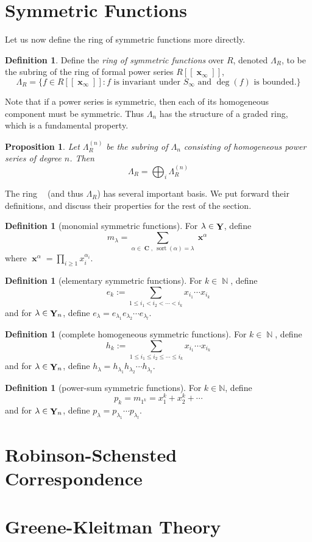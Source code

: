 \documentclass{amsart}
\theoremstyle{plain}
\newtheorem{prop}[theorem]{Proposition}
\theoremstyle{definition}
\newtheorem{definition}[theorem]{Definition}
\DeclareMathOperator{\nn}{\mathbb{N}}
\DeclareMathOperator{\yy}{{\bf Y}}
\DeclareMathOperator{\xx}{\textbf{x}}
\DeclareMathOperator{\sort}{sort}
\DeclareMathOperator{\Ln}{\Lambda^{(n)} }
\DeclareMathOperator{\comp}{\textbf{C}}
\begin{document}
\section{Symmetric Functions}
Let us now define the ring of symmetric functions more directly.
\begin{definition}
	Define the \emph{ring of symmetric functions} over $R$, denoted $\Lambda_R$, to be the subring of the ring of formal power series $R[[\xx_{\infty}]]$,
	\[\Lambda_R=\{f\in R[[\xx_\infty]]:
		f \text{ is invariant under }S_{\infty}\text{ and }\deg(f)\text{ is bounded}.
	\}\]
\end{definition}
Note that if a power series is symmetric, then each of its homogeneous component must be symmetric. Thus $\Lambda_n$ has the structure of a graded ring, which is a fundamental property.
\begin{prop}
Let $\Lambda_R^{(n)}$ be the subring of $\Lambda_n$ consisting of homogeneous power series of degree $n$. Then
\[\Lambda_R = \bigoplus_i \Lambda_R^{(n)}\]	
\end{prop}
The ring $\Ln$ (and thus $\Lambda_R$) has several important basis. We put forward their definitions, and discuss their properties for the rest of the section.

\begin{definition}[monomial symmetric functions]
For $\lambda\in \yy$, define 
\[m_\lambda = \sum_{\alpha\in\comp,\ \sort(\alpha)=\lambda}\xx^\alpha\]
where $\xx^{\alpha} =\prod_{i\geq 1} x_i^{\alpha_i}$.
	
\end{definition}
\begin{definition}[elementary symmetric functions] For $k\in\nn$, define
\[e_k := \sum_{1\leq i_1<i_2<\cdots<i_k} x_{i_1}\cdots x_{i_k}\]
 and for $\lambda\in \yy_n$, define $e_{\lambda}=e_{\lambda_1}e_{\lambda_2}\cdots e_{\lambda_l}$.
 
	
\end{definition}
\begin{definition}[complete homogeneous symmetric functions] For $k\in\nn$, define
\[h_k := \sum_{1\leq i_1\leq i_2\leq \cdots \leq i_k} x_{i_1}\cdots x_{i_k}\]
 and for $\lambda\in \yy_n$, define $h_{\lambda}=h_{\lambda_1}h_{\lambda_2}\cdots h_{\lambda_l}$.
 \end{definition}
 \begin{definition}[power-sum symmetric functions] For $k\in\mathbb{N}$, define
 \[p_k = m_{1^k}=x_1^k+x_2^k+\cdots\]
 and for $\lambda\in \yy_n$, define $p_\lambda= p_{\lambda_1}\cdots p_{\lambda_l}$.
 	
 \end{definition}



\section{Robinson-Schensted Correspondence}
\section{Greene-Kleitman Theory}


\end{document}
